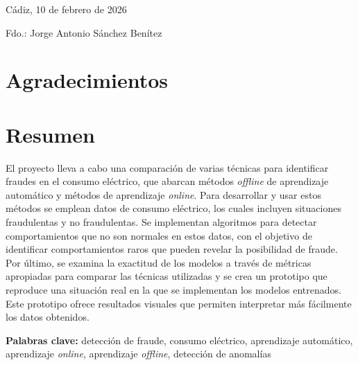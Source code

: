 \documentclass[12pt,a4paper]{report}
\begin{document}
\vspace{1cm}

\begin{flushright}
Cádiz, 10 de febrero de 2026

\vspace{1cm}

Fdo.: Jorge Antonio Sánchez Benítez
\end{flushright}

\newpage
\thispagestyle{empty}
\null
\newpage

\newpage
\thispagestyle{empty}
\section*{Agradecimientos}
\newpage

\newpage
\thispagestyle{empty}

\section*{Resumen}

El proyecto lleva a cabo una comparación de varias técnicas para identificar fraudes en el consumo eléctrico, que abarcan métodos \emph{offline} de aprendizaje automático y métodos de aprendizaje \emph{online}. Para desarrollar y usar estos métodos se emplean datos de consumo eléctrico, los cuales incluyen situaciones fraudulentas y no fraudulentas. Se implementan algoritmos para detectar comportamientos que no son normales en estos datos, con el objetivo de identificar comportamientos raros que pueden revelar la posibilidad de fraude. Por último, se examina la exactitud de los modelos a través de métricas apropiadas para comparar las técnicas utilizadas y se crea un prototipo que reproduce una situación real en la que se implementan los modelos entrenados. Este prototipo ofrece resultados visuales que permiten interpretar más fácilmente los datos obtenidos.
\medskip

\noindent\textbf{Palabras clave:} detección de fraude, consumo eléctrico, aprendizaje automático, aprendizaje \emph{online}, aprendizaje \emph{offline}, detección de anomalías

\newpage
\tableofcontents
\newpage
\end{document}
